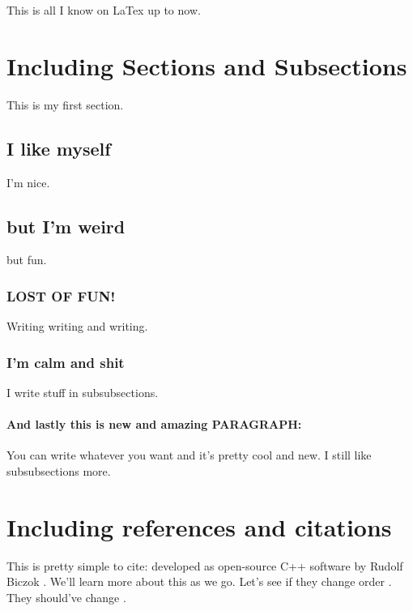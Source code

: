 

\label{chap:howtodo}
This is all I know on LaTex up to now.

\section{Including Sections and Subsections}
This is my first section.

\subsection{I like myself}
I'm nice.

\subsection{but I'm weird}
but fun.

\subsubsection{LOST OF FUN!}
Writing writing and writing.

\subsubsection{I'm calm and shit}
I write stuff in subsubsections.

\paragraph*{And lastly this is new and amazing PARAGRAPH:} You can write whatever you want and it's pretty cool and new. I still like subsubsections more. 

\section{Including references and citations}
This is pretty simple to cite: developed as open-source C++ software by Rudolf Biczok \cite{nomenclatore}.
We'll learn more about this as we go. Let's see if they change order \cite{notonlyinfectious}. They should've change \cite{nonsoloinfezioni}.



